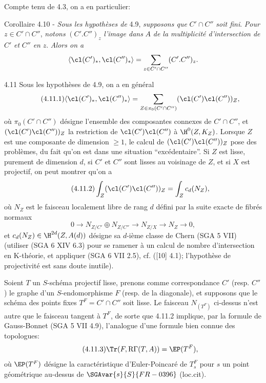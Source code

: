 Compte tenu de 4.3, on a en particulier:

\begin{statement}{Corollaire 4.10 -}
\emph{Sous les hypothèses de} 4.9, \emph{supposons que} $C'\cap C''$ \emph{soit fini}. \emph{Pour} $z\in C'\cap C''$, \emph{notons} $(C'.C'')_z$ \emph{l'image dans} $A$ \emph{de la multiplicité d'intersection de} $C'$ \emph{et} $C''$ \emph{en} $z$. \emph{Alors on a}
\[
\langle \cl(C')_*,\cl(C'')_*\rangle
=
\sum_{z\in C'\cap C''}(C'.C'')_z.
\]
\end{statement}

\begin{statement}{4.11}
Sous les hypothèses de 4.9, on a en général
\begin{equation}
\tag{4.11.1}
\langle \cl(C')_*,\cl(C'')_*\rangle
=
\sum_{Z\in\pi_0(C'\cap C'')}(\cl(C')\cl(C''))_Z,
\end{equation}
où $\pi_0(C'\cap C'')$ désigne l'ensemble des composantes connexes de $C'\cap C''$, et $(\cl(C')\cl(C''))_Z$ la restriction de $\cl(C')\cl(C'')$ à $\H^0(Z,K_Z)$. Lorsque $Z$ est une composante de dimension $\geq 1$, le calcul de $(\cl(C')\cl(C''))_Z$ pose des problèmes, du fait qu'on est dans une situation ``excédentaire''. Si $Z$ est lisse, purement de dimension $d$, si $C'$ et $C''$ sont lisses au voisinage de $Z$, et si $X$ est projectif, on peut montrer qu'on a
\begin{equation}
\tag{4.11.2}
\int_Z(\cl(C')\cl(C''))_Z=\int_Z c_d(N_Z),
\end{equation}
où $N_Z$ est le faisceau localement libre de rang $d$ défini par la suite exacte de fibrés normaux
\[
0\longrightarrow N_{Z/C'}\oplus N_{Z/C''}\longrightarrow N_{Z/X}\longrightarrow N_Z\longrightarrow 0,
\]
et $c_d(N_Z)\in \H^{2d}(Z,A(d))$ désigne sa $d$-ième classe de Chern (SGA 5 VII) (utiliser (SGA 6 XIV 6.3) pour se ramener à un calcul de nombre d'intersection en K-théorie, et appliquer (SGA 6 VII 2.5), cf. ([10] 4.1); l'hypothèse de projectivité est sans doute inutile).

Soient $T$ un $S$-schéma projectif lisse, prenons comme correspondance $C'$ (resp. $C''$) le graphe d'un $S$-endomorphisme $F$ (resp. de la diagonale), et supposons que le schéma des points fixes $T^F=C'\cap C''$ soit lisse. Le faisceau $N_{(T^F)}$ ci-dessus n'est autre que le faisceau tangent à $T^F$, de sorte que 4.11.2 implique, par la formule de Gauss-Bonnet (SGA 5 VII 4.9), l'analogue d'une formule bien connue des topologues:
\begin{equation}
\tag{4.11.3}
\Tr(F,\mathrm{R}\Gamma(T,A))=\EP(T^F),
\end{equation}
où $\EP(T^F)$ désigne la caractéristique d'Euler-Poincaré de $T_s^F$ pour $s$ un point géométrique au-dessus de $\SGAvar{s}{S}{FR-0396}$ (loc.cit).
\end{statement}

